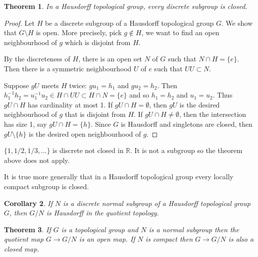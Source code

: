 \documentclass[12pt]{report}
\newtheorem{theorem}{Theorem}[section]
\newtheorem{corollary}[theorem]{Corollary}
\theoremstyle{definition}
\newcommand{\RR}{\mathbb{R}}
\begin{document}
\begin{theorem}
	In a Hausdorff topological group, every discrete subgroup is closed.
\end{theorem}

\begin{proof}
	Let $H$ be a discrete subgroup of a Hausdorff topological group $G$. We show that $G\setminus H$ is open. More precisely, pick $g\notin H$, we want to find an open neighbourhood of $g$ which is disjoint from $H$.

	By the discreteness of $H$, there is an open set $N$ of $G$ such that $N\cap H=\{e\}$. Then there is a symmetric neighbourhood $U$ of $e$ such that $UU\subset N$.

	Suppose $gU$ meets $H$ twice: $gu_1=h_1$ and $gu_2=h_2$. Then $h_1^{-1}h_2=u_1^{-1}u_2\in H\cap UU \subset H\cap N=\{e\}$ and so $h_1=h_2$ and $u_1=u_2$. Thus $gU\cap H$ has cardinality at most 1. If $gU\cap H=\emptyset$, then $gU$ is the desired neighbourhood of $g$ that is disjoint from $H$. If $gU\cap H\not=\emptyset$, then the intersection has size 1, say $gU\cap H=\{h\}$. Since $G$ is Hausdorff and singletons are closed, then $gU\setminus\{h\}$ is the desired open neighbourhood of $g$.
\end{proof}

\begin{remark}
	$\{1,1/2,1/3,\dots\}$ is discrete not closed in $\RR$. It is not a subgroup so the theorem above does not apply.
\end{remark}

It is true more generally that in a Hausdorff topological group every locally compact subgroup is closed.

\begin{corollary}
	If $N$ is a discrete normal subgroup of a Hausdorff topological group $G$, then $G/N$ is Hausdorff in the quotient topology.
\end{corollary}

\begin{theorem}\label{26.14}
	If $G$ is a topological group and $N$ is a normal subgroup then the quotient map $G\to G/N$ is an open map. If $N$ is compact then $G\to G/N$ is also a closed map.
\end{theorem}
\end{document}
